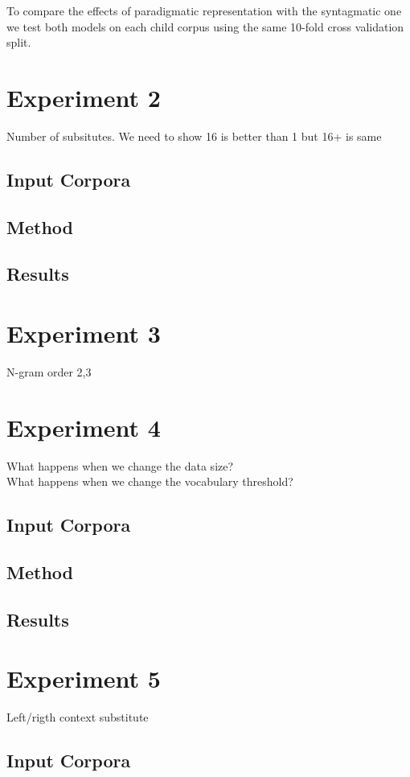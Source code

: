 To compare the effects of paradigmatic representation with the
syntagmatic one we test both models on each child corpus using the
same 10-fold cross validation split.



\section{Experiment 2}
Number of subsitutes.  We need to show 16 is better than 1 but 16+ is same
\subsection{Input Corpora}
\subsection{Method}
\subsection{Results}

\section{Experiment 3}
N-gram order 2,3

\section{Experiment 4}
What happens when we change the data size?\\
What happens when we change the vocabulary threshold?\\

\subsection{Input Corpora}
\subsection{Method}
\subsection{Results}

\section{Experiment 5}
Left/rigth context substitute
\subsection{Input Corpora}
